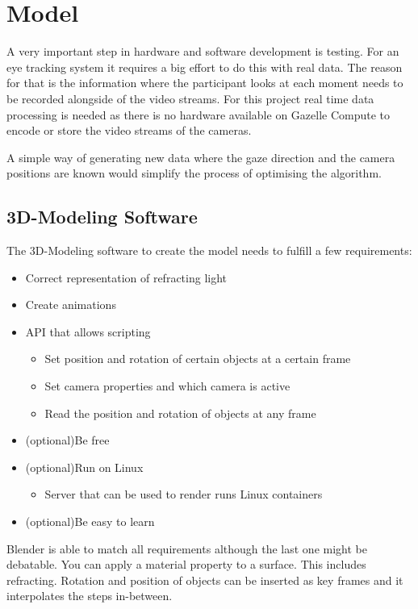 \chapter{Model}
\label{chap:Model}

A very important step in hardware and software development is testing. For an eye tracking system it requires a big effort to do this with real data. The reason for that is the information where the participant looks at each moment needs to be recorded alongside of the video streams. For this project real time data processing is needed as there is no hardware available on Gazelle Compute to encode or store the video streams of the cameras.

A simple way of generating new data where the gaze direction and the camera positions are known would simplify the process of optimising the algorithm. 
\section{3D-Modeling Software}
\label{sec:whatIsImportant}

The 3D-Modeling software to create the model needs to fulfill a few requirements:
\begin{itemize}
	\item Correct representation of refracting light
	\item Create animations 
	\item \gls{API} that allows scripting
	\begin{itemize}
		\item Set position and rotation of certain objects at a certain frame
		\item Set camera properties and which camera is active
		\item Read the position and rotation of objects at any frame
	\end{itemize}
	\item (optional)Be free
	\item (optional)Run on Linux
	\begin{itemize}
		\item Server that can be used to render runs Linux containers
	\end{itemize}
	\item (optional)Be easy to learn
\end{itemize}

Blender is able to match all requirements although the last one might be debatable. You can apply a material property to a surface. This includes refracting. Rotation and position of objects can be inserted as key frames and it interpolates the steps in-between. 

